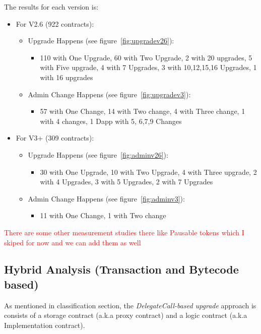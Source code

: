 The results for each version is:
\begin{itemize}
  \item For V2.6 (922 contracts):
  \begin{itemize}
    \item Upgrade Happens (see figure~\ref{fig:upgradev26}):
    \begin{itemize}
      \item 110 with One Upgrade, 60 with Two Upgrade, 2 with 20 upgrades, 5 with Five upgrade, 4 with 7 Upgrades, 3 with 10,12,15,16 Upgrades, 1 with 16 upgrades
    \end{itemize}
    \item Admin Change Happens (see figure~\ref{fig:upgradev3}):
    \begin{itemize}
      \item 57 with One Change, 14 with Two change, 4 with Three change, 1 with 4 changes, 1 Dapp with 5, 6,7,9 Changes
    \end{itemize}
  \end{itemize}
  \item For V3+ (309 contracts):
  \begin{itemize}
    \item Upgrade Happens (see figure~\ref{fig:adminv26}):
    \begin{itemize}
      \item 30 with One Upgrade, 10 with Two Upgrade, 4 with Three upgrade, 2 with 4 Upgrades, 3 with 5 Upgrades, 2 with 7 Upgrades
    \end{itemize}
    \item Admin Change Happens (see figure~\ref{fig:adminv3}):
    \begin{itemize}
      \item 11 with One Change, 1 with Two change
    \end{itemize}
  \end{itemize}
\end{itemize}


\textcolor{red}{There are some other measurement studies there like Pausable tokens which I skiped for now and we can add them as well}



\subsection{Hybrid Analysis (Transaction and Bytecode based)}
As mentioned in classification section, the \textit{DelegateCall-based upgrade} approach is consists of a storage contract (a.k.a proxy contract) and a logic contract (a.k.a Implementation contract). 

